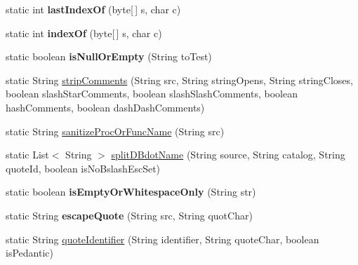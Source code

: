 \begin{DoxyCompactItemize}
\item 
\mbox{\label{classcom_1_1mysql_1_1jdbc_1_1_string_utils_a597f05ea484529053474e70198a8ef79}} 
static int {\bfseries last\+Index\+Of} (byte\mbox{[}$\,$\mbox{]} s, char c)
\item 
\mbox{\label{classcom_1_1mysql_1_1jdbc_1_1_string_utils_a783b290a273765cd318bebbd9c5d1fe9}} 
static int {\bfseries index\+Of} (byte\mbox{[}$\,$\mbox{]} s, char c)
\item 
\mbox{\label{classcom_1_1mysql_1_1jdbc_1_1_string_utils_a929f419cc0fde41e6209dc252273fc75}} 
static boolean {\bfseries is\+Null\+Or\+Empty} (String to\+Test)
\item 
static String \mbox{\hyperlink{classcom_1_1mysql_1_1jdbc_1_1_string_utils_ad636754b7611d6235efff200a958779c}{strip\+Comments}} (String src, String string\+Opens, String string\+Closes, boolean slash\+Star\+Comments, boolean slash\+Slash\+Comments, boolean hash\+Comments, boolean dash\+Dash\+Comments)
\item 
static String \mbox{\hyperlink{classcom_1_1mysql_1_1jdbc_1_1_string_utils_a5a12075fbc5dc15fb882600f8d424f39}{sanitize\+Proc\+Or\+Func\+Name}} (String src)
\item 
static List$<$ String $>$ \mbox{\hyperlink{classcom_1_1mysql_1_1jdbc_1_1_string_utils_a7fe39164a1f79c6421f46509e672693a}{split\+D\+Bdot\+Name}} (String source, String catalog, String quote\+Id, boolean is\+No\+Bslash\+Esc\+Set)
\item 
\mbox{\label{classcom_1_1mysql_1_1jdbc_1_1_string_utils_a77826106be5c7373867af85a7633336d}} 
static boolean {\bfseries is\+Empty\+Or\+Whitespace\+Only} (String str)
\item 
\mbox{\label{classcom_1_1mysql_1_1jdbc_1_1_string_utils_a4a3f8c3f231e3f1c50d8fc9aa334061e}} 
static String {\bfseries escape\+Quote} (String src, String quot\+Char)
\item 
static String \mbox{\hyperlink{classcom_1_1mysql_1_1jdbc_1_1_string_utils_ad75792b3351810790b35be02d6481bec}{quote\+Identifier}} (String identifier, String quote\+Char, boolean is\+Pedantic)
\item 

\end{DoxyCompactItemize}
